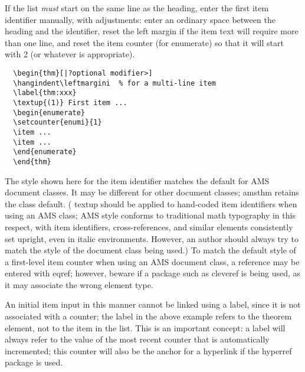 \documentclass[11pt,twoside]{article}
\newcommand{\ntt}{%
  \fontfamily\ttdefault \fontseries\mddefault \fontshape\updefault
  \selectfont
}
\DeclareRobustCommand{\cn}[1]{{\ntt\bslchar#1}}
\DeclareRobustCommand{\pkg}[1]{{\ntt#1}}
\DeclareRobustCommand{\env}[1]{{\ntt#1}}
\begin{document}
If the list \emph{must} start on the same line as the heading, enter
the first item identifier manually, with adjustments: enter an
ordinary space between the heading and the identifier, reset the left
margin if the item text will require more than one line, and reset
the item counter (for \env{enumerate}) so that it will start
with 2 (or whatever is appropriate).
\begin{verbatim}
  \begin{thm}[|?optional modifier>]
  \hangindent\leftmargini  % for a multi-line item
  \label{thm:xxx}
  \textup{(1)} First item ...
  \begin{enumerate}
  \setcounter{enumi}{1}
  \item ...
  \item ...
  \end{enumerate}
  \end{thm}
\end{verbatim}
The style shown here for the item identifier matches the default for
AMS document classes.  It may be different for other document classes;
\pkg{amsthm} retains the class default.  (\cn{textup} should be
applied to hand-coded item identifiers when using an AMS class; AMS
style conforms to traditional math typography in this respect, with item
identifiers, cross-references, and similar elements consistently set
upright, even in italic environments.  However, an author should always
try to match the style of the document class being used.)  To match the
default style of a first-level item counter when using an AMS document
class, a reference may be entered with \cn{eqref}; however, beware if
a package such as \pkg{cleveref} is being used, as it may associate the
wrong element type.

An initial item input in this manner cannot be linked using a \cn{label},
since it is not associated with a counter; the \cn{label} in the above
example refers to the theorem element, not to the item in the list.
This is an important concept: a \cn{label} will always refer to the
value of the most recent counter that is automatically incremented;
this counter will also be the anchor for a hyperlink if the
\pkg{hyperref} package is used.




\enlargethispage{1\baselineskip} %
\end{document}
